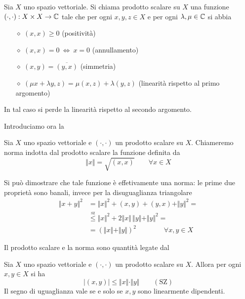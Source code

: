 \begin{defn}
Sia $X$ uno spazio vettoriale. Si chiama prodotto scalare su $X$ una funzione $(\cdot,\cdot):X\times X\to\mathbb{C}$ tale che per ogni $x,y,z\in X$ e per ogni $\lambda,\mu\in\mathbb{C}$ si abbia
\begin{enumerate}
    \item [$\diamond$] $(x,x)\geq 0$ (positività)
    \item [$\diamond$] $(x,x)=0\ \Leftrightarrow\ x=0$ (annullamento)
    \item [$\diamond$] $(x,y)=\overline{(y,x)}$ (simmetria)
    \item [$\diamond$] $(\mu x+\lambda y,z)=\mu(x,z)+\lambda(y,z)$ (linearità rispetto al primo argomento)
\end{enumerate}
\end{defn}
In tal caso si perde la linearità rispetto al secondo argomento.

Introduciamo ora la
\begin{defn}
Sia $X$ uno spazio vettoriale e $(\cdot,\cdot)$ un prodotto scalare su $X$. Chiameremo norma indotta dal prodotto scalare la funzione definita da
\begin{equation*}
\Vert x\Vert =\sqrt{(x,x)} \qquad \forall x \in X
\end{equation*}
\end{defn}
Si può dimostrare che tale funzione è effetivamente una norma: le prime due proprietà sono banali, invece per la disuguaglianza triangolare
\begin{align*}
\Vert x+y \Vert ^2&=\Vert x \Vert^2+(x,y)+(y,x)+\Vert y \Vert^2= \\
&\overset{\underset{\text{SZ}}{}}{\leq} \Vert x \Vert^2+2\Vert x\Vert\,\Vert y\Vert +\Vert y \Vert^2= \\
&=\left(\Vert x\Vert+\Vert y\Vert\right)^2 \qquad \qquad \forall x,y\in X
\end{align*}

Il prodotto scalare e la norma sono quantità legate dal
\begin{thm}[di Schwarz]
Sia $X$ uno spazio vettoriale e $(\cdot,\cdot)$ un prodotto scalare su $X$. Allora per ogni $x,y\in X$ si ha
\begin{equation*}
\boxed{|(x,y)|\leq \Vert x\Vert \cdot \Vert y \Vert}\qquad (\text{SZ})
\end{equation*}
Il segno di uguaglianza vale se e solo se $x,y$ sono linearmente dipendenti.
\end{thm}

